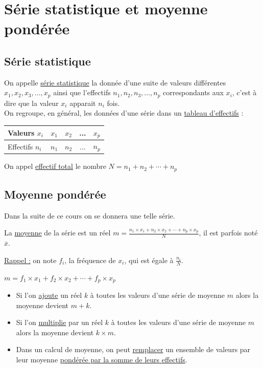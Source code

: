 \documentclass[french]{book}
\begin{document}
\section{Série statistique et moyenne pondérée}
\subsection{Série statistique}
\begin{defn}
On appelle \underline{série statistique} la donnée d'une suite de valeurs différentes $x_1,x_2,x_3,...,x_p$ ainsi que l'effectifs $n_1,n_2,n_3,...,n_p$ correspondants aux $x_i$, c'est à dire que la valeur $x_i$ apparait $n_i$ fois.\\

On regroupe, en général, les données d'une série dans un \underline{tableau d'effectifs} :\\

\begin{center}


\begin{tabular}{|l|c|c|c|c|}
  \hline
  Valeurs $x_i$ & $x_1$ & $x_2$ & ... & $x_p$ \\
  \hline
 Effectifs $n_i$ & $n_1$ & $n_2$ & ... & $n_p$ \\
  \hline
\end{tabular} 
\end{center}
On appel \underline{effectif total} le nombre $N=n_1+n_2+ \cdots + n_p$
\end{defn}

\subsection{Moyenne pondérée}
Dans la suite de ce cours on se donnera une telle série.

\begin{defn}
La \underline{moyenne} de la série est un réel $m=\frac{n_1\times x_1 + n_2 \times x_2 + \cdots + n_p \times x_p }{N}$, il est parfois noté $\overline{x}$.
\end{defn}

\underline{Rappel :} on note $f_i$, la fréquence de $x_i$, qui est égale à $\frac{n_i}{N}$.

\begin{prop}
$m=f_1 \times x_1 + f_2 \times x_2 + \cdots +f_p \times x_p$
\end{prop}


\begin{prop}
\begin{itemize}
\item[1)] Si l'on \underline{ajoute} un réel $k$ à toutes les valeurs d'une série de moyenne $m$ alors la moyenne devient $m+k$.
\item[2)] Si l'on \underline{multiplie} par un réel $k$ à toutes les valeurs d'une série de moyenne $m$ alors la moyenne devient $k \times m$.
\item[3)] Dans un calcul de moyenne, on peut \underline{remplacer} un ensemble de valeurs par leur moyenne \underline{pondérée par la somme de leurs effectifs}.

\end{itemize}
\end{prop}
\end{document}

